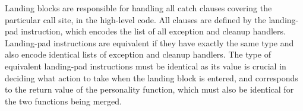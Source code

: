 Landing blocks are responsible for handling all catch clauses covering the
particular call site, in the high-level code.
All clauses are defined by the landing-pad instruction, which encodes the list of
all exception and cleanup handlers.
Landing-pad instructions are equivalent if they have exactly the same type and
also encode identical lists of exception and cleanup handlers.
The type of equivalent landing-pad instructions must be identical as its value
is crucial in deciding what action to take when the landing block is entered,
and corresponds to the return value of the personality function, which must also
be identical for the two functions being merged.





